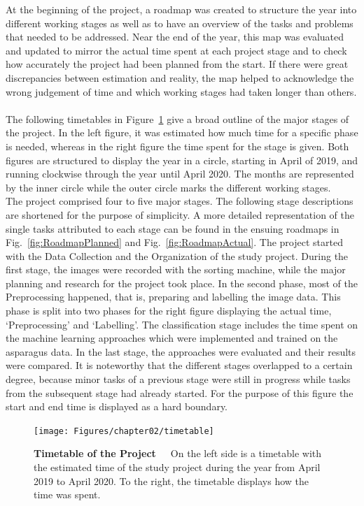 At the beginning of the project, a roadmap was created to structure the year into different working stages as well as to have an overview of the tasks and problems that needed to be addressed. Near the end of the year, this map was evaluated and updated to mirror the actual time spent at each project stage and to check how accurately the project had been planned from the start. If there were great discrepancies between estimation and reality, the map helped to acknowledge the wrong judgement of time and which working stages had taken longer than others. \\
\\
The following timetables in Figure~\ref{fig:Timetable} give a broad outline of the major stages of the project. In the left figure, it was estimated how much time for a specific phase is needed, whereas in the right figure the time spent for the stage is given. Both figures are structured to display the year in a circle, starting in April of 2019, and running clockwise through the year until April 2020. The months are represented by the inner circle while the outer circle marks the different working stages. \\
The project comprised four to five major stages. The following stage descriptions are shortened for the purpose of simplicity. A more detailed representation of the single tasks attributed to each stage can be found in the ensuing roadmaps in Fig.~\ref{fig:RoadmapPlanned} and Fig.~\ref{fig:RoadmapActual}. The project started with the Data Collection and the Organization of the study project. During the first stage, the images were recorded with the sorting machine, while the major planning and research for the project took place. In the second phase, most of the Preprocessing happened, that is, preparing and labelling the image data. This phase is split into two phases for the right figure displaying the actual time, ‘Preprocessing’ and ‘Labelling’. The classification stage includes the time spent on the machine learning approaches which were implemented and trained on the asparagus data. In the last stage, the approaches were evaluated and their results were compared. It is noteworthy that the different stages overlapped to a certain degree, because minor tasks of a previous stage were still in progress while tasks from the subsequent stage had already started. For the purpose of this figure the start and end time is displayed as a hard boundary. \\

\begin{figure}[h]
	\centering
	\texttt{[image: Figures/chapter02/timetable]}
	\decoRule
	\caption[Timetable of the Project]{\textbf{Timetable of the Project}~~~On the left side is a timetable with the estimated time of the study project during the year from April 2019 to April 2020. To the right, the timetable displays how the time was spent.}
	\label{fig:Timetable}
\end{figure}

